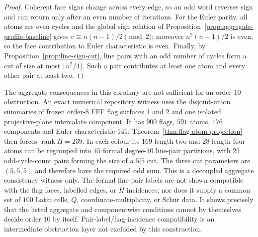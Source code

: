 \begin{proof}
Coherent face signs change across every edge, so an odd word reverses sign
and can return only after an even number of iterations.  For the Euler
parity, all atoms are even cycles and the global sign relation of
Proposition~\ref{prop:aggregate-profile-baseline} gives
$v\equiv n(n-1)/2\pmod2$; moreover $n^2(n-1)/2$ is even, so the face
contribution to Euler characteristic is even.  Finally, by
Proposition~\ref{prop:line-sign-cut}, line pairs with an
odd number of cycles form a cut of size at most $\lfloor n^2/4\rfloor$.
Such a pair contributes at least one atom and every other pair at least two.
\end{proof}

The aggregate consequences in this corollary are not sufficient for an
order-$10$ obstruction.  An exact numerical repository witness uses the
disjoint-union summaries of frozen order-$8$ FFF flag surfaces 1 and 2 and
one isolated projective-plane intercalate component.  It has $900$ flags, $591$ atoms,
$176$ components and Euler characteristic $141$;
Theorem~\ref{thm:flag-atom-projection} then forces
$\operatorname{rank}H=239$.  In each colour its $169$ length-two and $28$
length-four atoms can be regrouped into $45$ formal degree-$10$ line-pair
partitions, with $25$ odd-cycle-count pairs forming the size of a $5|5$ cut.
The three cut parameters are $(5,5,5)$ and therefore have the required odd
sum.  This is a decoupled aggregate consistency witness only.  The formal
line-pair labels are not shown compatible with the flag faces, labelled
edges, or $H$ incidences; nor does it supply a common set of $100$ Latin
cells, $Q$, coordinate-multiplicity, or Schur data.  It shows precisely that
the listed aggregate and componentwise conditions cannot by themselves
decide order $10$ by itself.  Pair-label/flag-incidence compatibility is an
intermediate obstruction layer not excluded by this construction.

